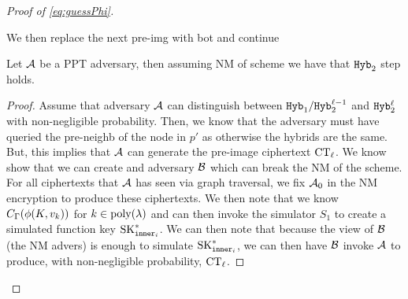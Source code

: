 \begin{proof}[Proof of \cref{eq:guessPhi}]
\begin{itemize}
\begin{itemize}
		We then replace the next pre-img with bot and continue
		\end{itemize}
	\end{itemize}
	\begin{lemma}
		\label{lem:NM}
		Let $\mathcal{A}$ be a PPT adversary, then assuming NM of scheme we have that $\texttt{Hyb}_2$ step holds.
		\begin{proof}
			Assume that adversary $\mathcal{A}$ can distinguish between $\texttt{Hyb}_1 / \texttt{Hyb}_2^{\ell - 1}$ and $\texttt{Hyb}_2^\ell$ with non-negligible probability.
			Then, we know that the adversary must have queried the pre-neighb of the node in $p'$
			as otherwise the hybrids are the same.
			But, this implies that $\mathcal{A}$ can generate the pre-image ciphertext $\text{CT}_\ell$.
			We know show that we can create and adversary $\mathcal{B}$ which can break the NM of the scheme.
			For all ciphertexts that $\mathcal{A}$ has seen via graph traversal, we fix $\mathcal{A}_0$ in the NM
			encryption to produce these ciphertexts. We then note that we know $C_\Gamma(\phi(K, v_k))$
			for $k \in \operatorname{poly}(\lambda)$ and can then invoke the simulator $S_1$ to create a simulated function key $\text{SK}_{\texttt{inner}_i}^*$.
			We can then note that because the view of $\mathcal{B}$ (the NM advers) is enough to simulate $\text{SK}_{\texttt{inner}_i}^*$, we can then
			have $\mathcal{B}$ invoke $\mathcal{A}$ to produce, with non-negligible probability, $\text{CT}_\ell$.




		\end{proof}
	\end{lemma}
	
\end{proof}

